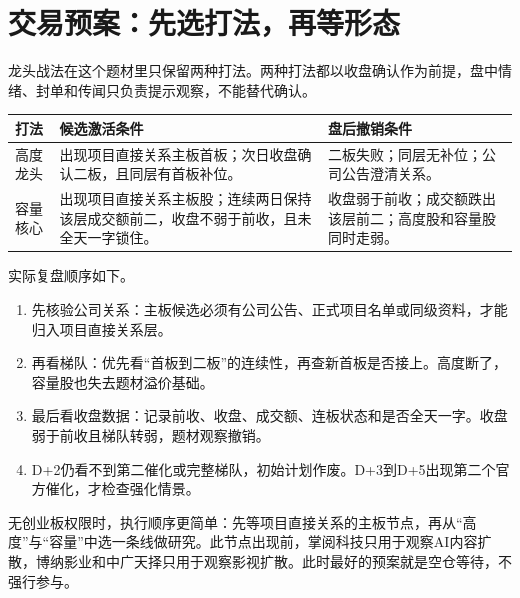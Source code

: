 \section{交易预案：先选打法，再等形态}

龙头战法在这个题材里只保留两种打法。两种打法都以收盘确认作为前提，盘中情绪、封单和传闻只负责提示观察，不能替代确认。

\begin{exhibitbox}[展品：两种可研究的打法]
\begin{tabularx}{\textwidth}{L{2.3cm}X X}
\toprule
打法 & 候选激活条件 & 盘后撤销条件 \\
\midrule
高度龙头 & 出现项目直接关系主板首板；次日收盘确认二板，且同层有首板补位。 & 二板失败；同层无补位；公司公告澄清关系。 \\
容量核心 & 出现项目直接关系主板股；连续两日保持该层成交额前二，收盘不弱于前收，且未全天一字锁住。 & 收盘弱于前收；成交额跌出该层前二；高度股和容量股同时走弱。 \\
\bottomrule
\end{tabularx}
\end{exhibitbox}

实际复盘顺序如下。

\begin{enumerate}
  \item 先核验公司关系：主板候选必须有公司公告、正式项目名单或同级资料，才能归入项目直接关系层。
  \item 再看梯队：优先看“首板到二板”的连续性，再查新首板是否接上。高度断了，容量股也失去题材溢价基础。
  \item 最后看收盘数据：记录前收、收盘、成交额、连板状态和是否全天一字。收盘弱于前收且梯队转弱，题材观察撤销。
  \item D+2仍看不到第二催化或完整梯队，初始计划作废。D+3到D+5出现第二个官方催化，才检查强化情景。
\end{enumerate}

无创业板权限时，执行顺序更简单：先等项目直接关系的主板节点，再从“高度”与“容量”中选一条线做研究。此节点出现前，掌阅科技只用于观察AI内容扩散，博纳影业和中广天择只用于观察影视扩散。此时最好的预案就是空仓等待，不强行参与。
